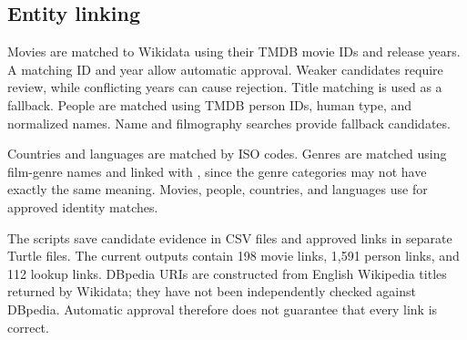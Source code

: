 \subsection{Entity linking}
Movies are matched to Wikidata using their TMDB movie IDs and release years. A matching ID and year allow automatic approval. Weaker candidates require review, while conflicting years can cause rejection. Title matching is used as a fallback. People are matched using TMDB person IDs, human type, and normalized names. Name and filmography searches provide fallback candidates.

Countries and languages are matched by ISO codes. Genres are matched using film-genre names and linked with , since the genre categories may not have exactly the same meaning. Movies, people, countries, and languages use  for approved identity matches.

The scripts save candidate evidence in CSV files and approved links in separate Turtle files. The current outputs contain 198 movie links, 1,591 person links, and 112 lookup links. DBpedia URIs are constructed from English Wikipedia titles returned by Wikidata; they have not been independently checked against DBpedia. Automatic approval therefore does not guarantee that every link is correct.
